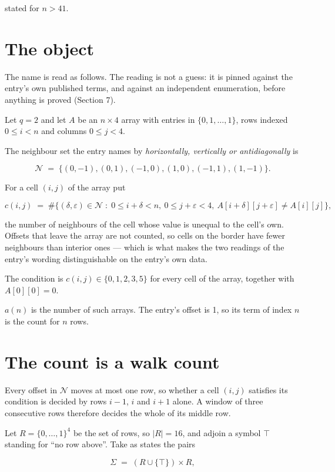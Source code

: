 \documentclass[11pt]{article}
\theoremstyle{definition}
\begin{document}
stated for $n > 41$.

\section{The object}

The name is read as follows. The reading is not a guess: it is pinned against the entry's own published terms, and against an independent enumeration, before anything is proved (Section 7).

Let $q = 2$ and let $A$ be an $n \times 4$ array with entries in $\{0,1,\dots,1\}$, rows indexed $0 \le i < n$ and columns $0 \le j < 4$.

The neighbour set the entry names by {\itshape horizontally, vertically or antidiagonally} is

\[\mathcal{N} \;=\; \{(0,-1), (0,1), (-1,0), (1,0), (-1,1), (1,-1)\}.\]

For a cell $(i,j)$ of the array put

\[c(i,j) \;=\; \#\bigl\{(\delta,\varepsilon)\in\mathcal{N} \;:\; 0\le i+\delta<n,\ 0\le j+\varepsilon<4,\ A[i+\delta][j+\varepsilon] \neq A[i][j]\bigr\},\]

the number of neighbours of the cell whose value is unequal to the cell's own. Offsets that leave the array are not counted, so cells on the border have fewer neighbours than interior ones --- which is what makes the two readings of the entry's wording distinguishable on the entry's own data.

The condition is $c(i,j) \in \{0, 1, 2, 3, 5\}$ for every cell of the array, together with $A[0][0]=0$.

$a(n)$ is the number of such arrays. The entry's offset is 1, so its term of index $n$ is the count for $n$ rows.

\section{The count is a walk count}

Every offset in $\mathcal{N}$ moves at most one row, so whether a cell $(i,j)$ satisfies its condition is decided by rows $i-1$, $i$ and $i+1$ alone. A window of three consecutive rows therefore decides the whole of its middle row.

Let $R = \{0,\dots,1\}^{4}$ be the set of rows, so $|R| = 16$, and adjoin a symbol $\top$ standing for ``no row above''. Take as states the pairs

\[\Sigma \;=\; (R \cup \{\top\}) \times R,\]
\end{document}
